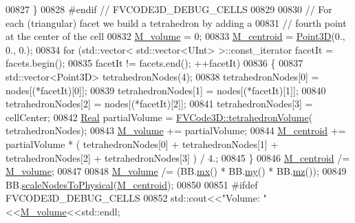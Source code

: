 \begin{DoxyCode}
00827         \}
00828 \textcolor{preprocessor}{#endif // FVCODE3D\_DEBUG\_CELLS}
00829 
00830         \textcolor{comment}{// For each (triangular) facet we build a tetrahedron by adding a}
00831         \textcolor{comment}{// fourth point at the center of the cell}
00832         \hyperlink{classFVCode3D_1_1Mesh3D_1_1Cell3D_a7616a6d28fcd8013bc52f4d754569e60}{M\_volume} = 0;
00833         \hyperlink{classFVCode3D_1_1Mesh3D_1_1Cell3D_a85077932a074f0903d085f9d33a13e09}{M\_centroid} = \hyperlink{classFVCode3D_1_1Point3D}{Point3D}(0., 0., 0.);
00834         \textcolor{keywordflow}{for} (std::vector< std::vector<UInt> >::const\_iterator facetIt = facets.begin();
00835             facetIt != facets.end(); ++facetIt)
00836         \{
00837             std::vector<Point3D> tetrahedronNodes(4);
00838             tetrahedronNodes[0] = nodes[(*facetIt)[0]];
00839             tetrahedronNodes[1] = nodes[(*facetIt)[1]];
00840             tetrahedronNodes[2] = nodes[(*facetIt)[2]];
00841             tetrahedronNodes[3] = cellCenter;
00842             \hyperlink{namespaceFVCode3D_a40c1f5588a248569d80aa5f867080e83}{Real} partialVolume = \hyperlink{namespaceFVCode3D_a8a6b07162e2801b628c3bd4057b9f221}{FVCode3D::tetrahedronVolume}(
      tetrahedronNodes);
00843             \hyperlink{classFVCode3D_1_1Mesh3D_1_1Cell3D_a7616a6d28fcd8013bc52f4d754569e60}{M\_volume} += partialVolume;
00844             \hyperlink{classFVCode3D_1_1Mesh3D_1_1Cell3D_a85077932a074f0903d085f9d33a13e09}{M\_centroid} += partialVolume * ( tetrahedronNodes[0] + tetrahedronNodes[1] + 
      tetrahedronNodes[2] + tetrahedronNodes[3] ) / 4.;
00845         \}
00846         \hyperlink{classFVCode3D_1_1Mesh3D_1_1Cell3D_a85077932a074f0903d085f9d33a13e09}{M\_centroid} /= \hyperlink{classFVCode3D_1_1Mesh3D_1_1Cell3D_a7616a6d28fcd8013bc52f4d754569e60}{M\_volume};
00847 
00848         \hyperlink{classFVCode3D_1_1Mesh3D_1_1Cell3D_a7616a6d28fcd8013bc52f4d754569e60}{M\_volume} /= (BB.\hyperlink{classFVCode3D_1_1BoundingBox_a2afb68488fb7361595825089c271fa23}{mx}() * BB.\hyperlink{classFVCode3D_1_1BoundingBox_a286722e958824c1798a85a55325d9fe5}{my}() * BB.\hyperlink{classFVCode3D_1_1BoundingBox_aaff1f6eb030c4f8a15dd22c79a28bf0c}{mz}());
00849         BB.\hyperlink{classFVCode3D_1_1BoundingBox_ae45df69b786a19e4413691e1c64059d0}{scaleNodesToPhysical}(\hyperlink{classFVCode3D_1_1Mesh3D_1_1Cell3D_a85077932a074f0903d085f9d33a13e09}{M\_centroid});
00850 
00851 \textcolor{preprocessor}{#ifdef FVCODE3D\_DEBUG\_CELLS}
00852         std::cout<<\textcolor{stringliteral}{"Volume: "}<<\hyperlink{classFVCode3D_1_1Mesh3D_1_1Cell3D_a7616a6d28fcd8013bc52f4d754569e60}{M\_volume}<<std::endl;

\end{DoxyCode}
